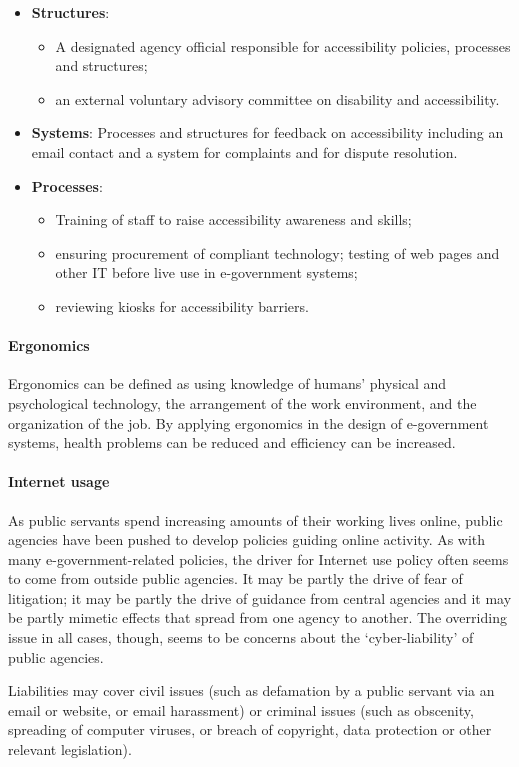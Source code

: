 \begin{itemize}
	\item \textbf{Structures}: 
	\begin{itemize}
		\item A designated agency official responsible for accessibility policies, processes and structures; 
		\item an external voluntary advisory committee on disability and accessibility.
	\end{itemize}

\item \textbf{Systems}:  Processes and structures for feedback on accessibility including an email	contact and a system for complaints and for dispute resolution.
	
	\item \textbf{Processes}: 
	\begin{itemize}
		\item Training of staff to raise accessibility awareness and skills; 
		\item ensuring procurement of compliant technology; testing of web pages and other IT before
		live use in e-government systems; 
		\item reviewing kiosks for accessibility barriers.
	\end{itemize}

\end{itemize}

\paragraph*{Ergonomics}
Ergonomics can be defined as using knowledge of humans' physical and psychological technology, the arrangement of the work environment, and the organization of the job. By applying ergonomics in the design of e-government systems, health problems can be reduced and efficiency can be increased. 

\paragraph*{Internet usage}

As public servants spend increasing amounts of their working lives online, public agencies have been pushed to develop policies guiding online activity. As with many e-government-related policies, the driver for Internet use policy often seems to come from outside public agencies. It may be partly the drive of fear of litigation; it may be partly the drive of guidance from central agencies and it may be partly mimetic effects that spread from one agency to another. The overriding issue in all cases, though, seems to be concerns about the `cyber-liability’ of public agencies. 

Liabilities may cover civil issues (such as defamation by a public servant via an email or website, or email harassment) or criminal issues (such as obscenity, spreading of computer viruses, or breach of copyright, data protection or other relevant legislation).
